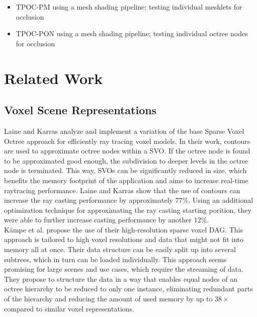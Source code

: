 \documentclass[conference]{IEEEtran}
\begin{document}
\begin{itemize}
    \item \ac{TPOC-PM} using a mesh shading pipeline; testing individual meshlets for occlusion 
    \item \ac{TPOC-PON} using a mesh shading pipeline; testing individual octree nodes for occlusion
\end{itemize}

\section{Related Work}

\subsection{Voxel Scene Representations} \label{subsec-voxel-scn-rep}

\noindent
Laine and Karras \cite{b6} analyze and implement a variation of the base Sparse Voxel Octree
approach for efficiently ray tracing voxel models. In their work, contours are used to
approximate octree nodes within a \ac{SVO}. If the octree node is found
to be approximated good enough, the subdivision to deeper levels in the octree node is
terminated. This way, \ac{SVO}s can be significantly reduced in size, which benefits the memory 
footprint of the application and aims to increase real-time raytracing performance. Laine and 
Karras show that the use of contours can increase the ray casting performance by approximately 
$77\%$. Using an additional optimization technique for approximating the ray casting starting 
porition, they were able to further increase casting performance by another $12\%$.  \\

\noindent
Kämpe et al. \cite{b2} propose the use of their high-resolution sparse voxel \ac{DAG}. 
This approach is tailored to high voxel resolutions and data that might not fit into 
memory all at once. Their data structure can be easily split up into several subtrees, 
which in turn can be loaded individually. This approach seems promising for large scenes 
and use cases, which require the streaming of data. They propose to structure the data in 
a way that enables equal nodes of an octree hierarchy to be reduced to only one instance, 
eliminating redundant parts of the hierarchy and reducing the amount of used memory by up 
to $38\times$ compared to similar voxel representations. \\
\end{document}
